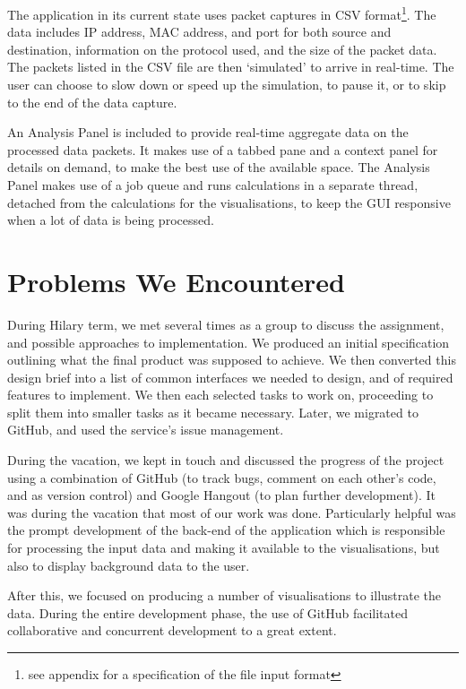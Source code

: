 \documentclass[12pt,a4paper]{article}
\begin{document}
			The application in its current state uses packet captures in CSV format\footnote{see appendix for a specification of the file input format}. The data includes IP address, MAC address, and port for both source and destination,  information on the protocol used, and the size of the packet data. The packets listed in the CSV file are then `simulated' to arrive in real-time. The user can choose to slow down or speed up the simulation, to pause it, or to skip to the end of the data capture.
			
			An Analysis Panel is included to provide real-time aggregate data on the processed data packets. It makes use of a tabbed pane and a context panel for details on demand, to make the best use of the available space. The Analysis Panel makes use of a job queue and runs calculations in a separate thread, detached from the calculations for the visualisations, to keep the GUI responsive when a lot of data is being processed.

	\section*{Problems We Encountered}
        During Hilary term, we met several times as a group to discuss the assignment, and possible approaches to implementation. We produced an initial specification outlining what the final product was supposed to achieve. We then converted this design brief into a list of common interfaces we needed to design, and of required features to implement. We then each selected tasks to work on, proceeding to split them into smaller tasks as it became necessary. Later, we migrated to GitHub, and used the service's issue management.
		
		During the vacation, we kept in touch and discussed the progress of the project using a combination of GitHub (to track bugs, comment on each other's code, and as version control) and Google Hangout (to plan further development). It was during the vacation that most of our work was done. Particularly helpful was the prompt development of the back-end of the application which is responsible for processing the input data and making it available to the visualisations, but also to display background data to the user.
		
		After this, we focused on producing a number of visualisations to illustrate the data. During the entire development phase, the use of GitHub facilitated collaborative and concurrent development to a great extent.
		
\end{document}
